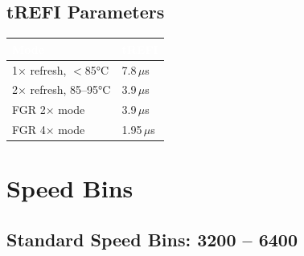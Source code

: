 \documentclass[10pt,a4paper,twoside]{article}
\newcommand{\thd}[1]{\cellcolor{navyblue}\textcolor{white}{\textbf{#1}}}
\newcommand{\trow}{\rowcolor{lightgray}}
\newcommand{\talt}{\rowcolor{skyblue!30}}
\begin{document}
\subsection{tREFI Parameters}

\begin{center}
\begin{tabularx}{0.75\linewidth}{@{} l l @{}}
\toprule
\thd{Mode} & \thd{tREFI} \\
\midrule
\trow 1$\times$ refresh, $<$85°C & 7.8\,$\mu$s \\
\talt 2$\times$ refresh, 85--95°C & 3.9\,$\mu$s \\
\trow FGR 2$\times$ mode & 3.9\,$\mu$s \\
\talt FGR 4$\times$ mode & 1.95\,$\mu$s \\
\bottomrule
\end{tabularx}
\end{center}

\section{Speed Bins}

\subsection{Standard Speed Bins: 3200 -- 6400}
\end{document}
